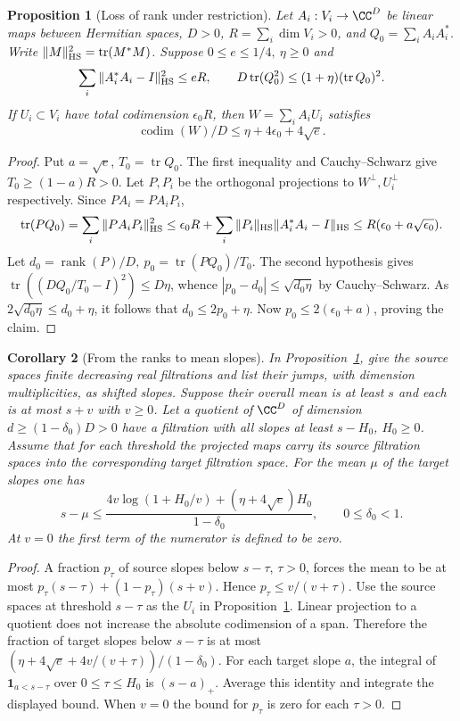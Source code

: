 \documentclass[a4paper,11pt]{article}
\newtheorem{proposition}{Proposition}[section]
\newtheorem{corollary}[proposition]{Corollary}
\theoremstyle{definition}
\theoremstyle{remark}
\numberwithin{equation}{section}
\begin{document}
\begin{proposition}[Loss of rank under restriction]\leavevmode\label{prop:rank11}
Let \(A_i:V_i\to\CC^D\) be linear maps between Hermitian spaces, \(D>0\), \(R=\sum_i\dim V_i>0\), and \(Q_0=\sum_i A_iA_i^*\). Write \(\|M\|_{\rm HS}^2=\operatorname{tr}(M^*M)\). Suppose \(0\le e\le1/4,\ \eta\ge0\) and
\[
 \sum_i\|A_i^*A_i-I\|_{\rm HS}^2\le eR,\qquad
 D\operatorname{tr}(Q_0^2)\le(1+\eta)(\operatorname{tr}Q_0)^2.
\]
If \(U_i\subset V_i\) have total codimension \(\epsilon_0R\), then \(W=\sum_i A_i U_i\) satisfies
\[
              \operatorname{codim}(W)/D\le\eta+4\epsilon_0+4\sqrt e .
\]
\end{proposition}
\begin{proof}
Put \(a=\sqrt e\), \(T_0=\operatorname{tr}Q_0\). The first inequality and Cauchy--Schwarz give \(T_0\ge(1-a)R>0\). Let \(P,P_i\) be the orthogonal projections to \(W^\perp,U_i^\perp\) respectively. Since \(PA_i=PA_iP_i\),
\[
 \operatorname{tr}(PQ_0)=\sum_i\|PA_iP_i\|_{\rm HS}^2
 \le \epsilon_0R+\sum_i \|P_i\|_{\rm HS}\|A_i^*A_i-I\|_{\rm HS}
 \le R(\epsilon_0+a\sqrt{\epsilon_0}).
\]
Let \(d_0=\operatorname{rank}(P)/D,\ p_0=\operatorname{tr}(PQ_0)/T_0\).
The second hypothesis gives \(\operatorname{tr}((DQ_0/T_0-I)^2)\le D\eta\), whence \(|p_0-d_0|\le\sqrt{d_0\eta}\) by Cauchy--Schwarz. As \(2\sqrt{d_0\eta}\le d_0+\eta\), it follows that \(d_0\le2p_0+\eta\). Now \(p_0\le2(\epsilon_0+a)\), proving the claim.
\end{proof}
\begin{corollary}[From the ranks to mean slopes]\label{cor:slopes12}
In Proposition~\ref{prop:rank11}, give the source spaces finite decreasing real filtrations and list their jumps, with dimension multiplicities, as shifted slopes. Suppose their overall mean is at least \(s\) and each is at most \(s+v\) with \(v\ge0\). Let a quotient of \(\CC^D\) of dimension \(d\ge(1-\delta_0)D>0\) have a filtration with all slopes at least \(s-H_0\), \(H_0\ge0\). Assume that for each threshold the projected maps carry its source filtration spaces into the corresponding target filtration space. For the mean \(\mu\) of the target slopes one has
\[
 s-\mu\le
 \frac{4v\log(1+H_0/v)+(\eta+4\sqrt e)H_0}{1-\delta_0},
 \qquad 0\le\delta_0<1 .
\]
At \(v=0\) the first term of the numerator is defined to be zero.
\end{corollary}
\begin{proof}
A fraction \(p_\tau\) of source slopes below \(s-\tau\), \(\tau>0\), forces the mean to be at most \(p_\tau(s-\tau)+(1-p_\tau)(s+v)\). Hence \(p_\tau\le v/(v+\tau)\). Use the source spaces at threshold \(s-\tau\) as the \(U_i\) in Proposition~\ref{prop:rank11}. Linear projection to a quotient does not increase the absolute codimension of a span. Therefore the fraction of target slopes below \(s-\tau\) is at most \((\eta+4\sqrt e+4v/(v+\tau))/(1-\delta_0)\). For each target slope \(a\), the integral of \(\mathbf1_{a<s-\tau}\) over \(0\le\tau\le H_0\) is \((s-a)_+\). Average this identity and integrate the displayed bound. When \(v=0\) the bound for \(p_\tau\) is zero for each \(\tau>0\).
\end{proof}
\end{document}
